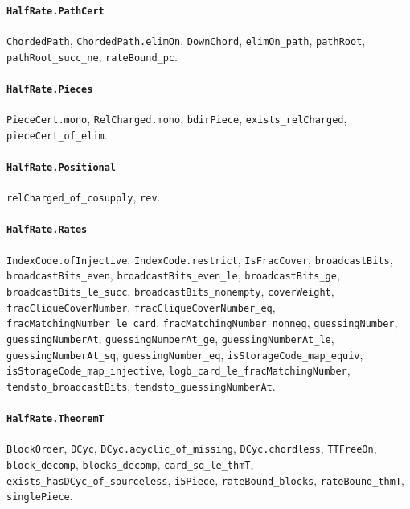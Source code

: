 \paragraph{\texttt{HalfRate.PathCert}}
{\small\raggedright \texttt{ChordedPath}, \texttt{ChordedPath.elimOn}, \texttt{DownChord}, \texttt{elimOn\_path}, \texttt{pathRoot}, \texttt{pathRoot\_succ\_ne}, \texttt{rateBound\_pc}.\par}

\paragraph{\texttt{HalfRate.Pieces}}
{\small\raggedright \texttt{PieceCert.mono}, \texttt{RelCharged.mono}, \texttt{bdirPiece}, \texttt{exists\_relCharged}, \texttt{pieceCert\_of\_elim}.\par}

\paragraph{\texttt{HalfRate.Positional}}
{\small\raggedright \texttt{relCharged\_of\_cosupply}, \texttt{rev}.\par}

\paragraph{\texttt{HalfRate.Rates}}
{\small\raggedright \texttt{IndexCode.ofInjective}, \texttt{IndexCode.restrict}, \texttt{IsFracCover}, \texttt{broadcastBits}, \texttt{broadcastBits\_even}, \texttt{broadcastBits\_even\_le}, \texttt{broadcastBits\_ge}, \texttt{broadcastBits\_le\_succ}, \texttt{broadcastBits\_nonempty}, \texttt{coverWeight}, \texttt{fracCliqueCoverNumber}, \texttt{fracCliqueCoverNumber\_eq}, \texttt{fracMatchingNumber\_le\_card}, \texttt{fracMatchingNumber\_nonneg}, \texttt{guessingNumber}, \texttt{guessingNumberAt}, \texttt{guessingNumberAt\_ge}, \texttt{guessingNumberAt\_le}, \texttt{guessingNumberAt\_sq}, \texttt{guessingNumber\_eq}, \texttt{isStorageCode\_map\_equiv}, \texttt{isStorageCode\_map\_injective}, \texttt{logb\_card\_le\_fracMatchingNumber}, \texttt{tendsto\_broadcastBits}, \texttt{tendsto\_guessingNumberAt}.\par}

\paragraph{\texttt{HalfRate.TheoremT}}
{\small\raggedright \texttt{BlockOrder}, \texttt{DCyc}, \texttt{DCyc.acyclic\_of\_missing}, \texttt{DCyc.chordless}, \texttt{TTFreeOn}, \texttt{block\_decomp}, \texttt{blocks\_decomp}, \texttt{card\_sq\_le\_thmT}, \texttt{exists\_hasDCyc\_of\_sourceless}, \texttt{i5Piece}, \texttt{rateBound\_blocks}, \texttt{rateBound\_thmT}, \texttt{singlePiece}.\par}

